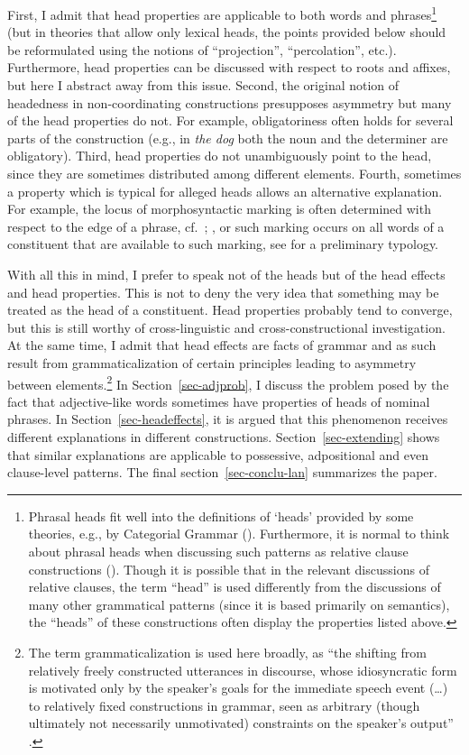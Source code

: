 \documentclass[output=paper
  ,nobabel
  ,draftmode
  ,colorlinks, citecolor=brown
]{langscibook}
\begin{document}
First, I admit that head properties are applicable to both words and phrases\footnote{Phrasal heads fit well into the definitions of ‘heads’ provided by some theories, e.g., by Categorial Grammar (\cite{Dowty2003}). Furthermore, it is normal to think about phrasal heads when discussing such patterns as relative clause constructions (\cite{KC77a}). Though it is possible that in the relevant discussions of relative clauses, the term ``head'' is used differently from the discussions of many other grammatical patterns (since it is based primarily on semantics), the ``heads'' of these constructions often display the properties listed above.} (but in theories that allow only lexical heads, the points provided below should be reformulated using the notions of ``projection'', ``percolation'', etc.). Furthermore, head properties can be discussed with respect to roots and affixes, but here I abstract away from this issue. Second, the original notion of headedness in non-coordinating constructions presupposes asymmetry but many of the head properties do not. For example, obligatoriness often holds for several parts of the construction (e.g., in \emph{the dog} both the noun and the determiner are obligatory). Third, head properties do not unambiguously point to the head, since they are sometimes distributed among different elements. Fourth, sometimes a property which is typical for alleged heads allows an alternative explanation. For example, the locus of morphosyntactic marking is often determined with respect to the edge of a phrase, cf.\ \citet{Klavans1985}; \citet[210]{Anderson92a-u},
or such marking occurs on all words of a constituent that are available to such marking, see \citet{LanderNichols2020}  for a preliminary typology. 

With all this in mind, I prefer to speak not of the heads but of the head effects and head properties. This is not to deny the very idea that something may be treated as the head of a constituent. Head properties probably tend to converge, but this is still worthy of cross-linguistic and cross-constructional investigation. At the same time, I admit that head effects are facts of grammar and as such result from grammaticalization of certain principles leading to asymmetry between elements.\footnote{The term grammaticalization is used here broadly, as ``the shifting from relatively freely constructed utterances in discourse, whose idiosyncratic form is motivated only by the speaker's goals for the immediate speech event (…) to relatively fixed constructions in grammar, seen as arbitrary (though ultimately not necessarily unmotivated) constraints on the speaker's output'' \citep[346]{Dubois1984}.} 
In Section~\ref{sec-adjprob}, I discuss the problem posed by the fact that adjective-like words sometimes have properties of heads of nominal phrases. In Section~\ref{sec-headeffects}, it is argued that this phenomenon receives different explanations in different constructions. Section~\ref{sec-extending} shows that similar explanations are applicable to possessive, adpositional and even clause-level patterns. The final section~\ref{sec-conclu-lan} summarizes the paper.
\end{document}
